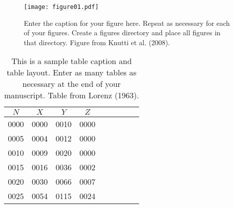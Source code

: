\documentclass[12pt]{article}
\begin{document}
\begin{figure}[t]
  \noindent\texttt{[image: figure01.pdf]}\\
  \caption{Enter the caption for your figure here.  Repeat as
  necessary for each of your figures. Create a figures directory and
  place all figures in that directory. Figure from Knutti et al. (2008).}\label{f1}
\end{figure}
\begin{table}[t]
\caption{This is a sample table caption and table layout.  Enter as many tables as
  necessary at the end of your manuscript. Table from Lorenz (1963).}\label{t1}
\begin{center}
\begin{tabular}{ccccrrcrc}
\hline\hline
$N$ & $X$ & $Y$ & $Z$\\
\hline
 0000 & 0000 & 0010 & 0000 \\
 0005 & 0004 & 0012 & 0000 \\
 0010 & 0009 & 0020 & 0000 \\
 0015 & 0016 & 0036 & 0002 \\
 0020 & 0030 & 0066 & 0007 \\
 0025 & 0054 & 0115 & 0024 \\
\hline
\end{tabular}
\end{center}
\end{table}
%
\end{document}
